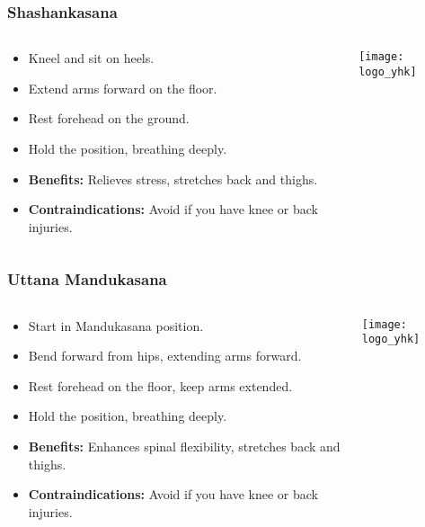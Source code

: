 \begin{frame}[fragile]\frametitle{Shashankasana}
\begin{columns}
    \begin{column}[T]{0.5\linewidth}
      \begin{itemize}
        \item Kneel and sit on heels.
        \item Extend arms forward on the floor.
        \item Rest forehead on the ground.
        \item Hold the position, breathing deeply.
        \item \textbf{Benefits:} Relieves stress, stretches back and thighs.
        \item \textbf{Contraindications:} Avoid if you have knee or back injuries.
      \end{itemize}
    \end{column}
    \begin{column}[T]{0.5\linewidth}
        \begin{center}
        \texttt{[image: logo\_yhk]}
        \end{center}    
    \end{column}
  \end{columns}
\end{frame}

\begin{frame}[fragile]\frametitle{Uttana Mandukasana}
\begin{columns}
    \begin{column}[T]{0.5\linewidth}
      \begin{itemize}
        \item Start in Mandukasana position.
        \item Bend forward from hips, extending arms forward.
        \item Rest forehead on the floor, keep arms extended.
        \item Hold the position, breathing deeply.
        \item \textbf{Benefits:} Enhances spinal flexibility, stretches back and thighs.
        \item \textbf{Contraindications:} Avoid if you have knee or back injuries.
      \end{itemize}
    \end{column}
    \begin{column}[T]{0.5\linewidth}
        \begin{center}
        \texttt{[image: logo\_yhk]}
        \end{center}    
    \end{column}
  \end{columns}
\end{frame}

